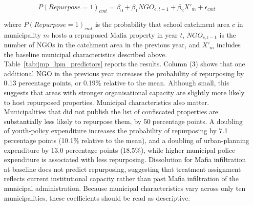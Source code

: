 \documentclass[12pt]{article}
\theoremstyle{plain}
\theoremstyle{plain}
\theoremstyle{plain}
\theoremstyle{definition}
\theoremstyle{plain}
\theoremstyle{definition}
\theoremstyle{plain}
\theoremstyle{remark}
\theoremstyle{definition}
\theoremstyle{definition}
\theoremstyle{plain}
\begin{document}
\begin{equation}
    P(Repurpose=1)_{cmt} = \beta_0 + \beta_1 NGO_{c,t-1} + \beta_2 X'_{m} + \epsilon_{cmt}
\end{equation}
\vspace{0.1cm}

where $P(Repurpose=1)_{cmt}$ is the probability that school catchment area $c$ in municipality $m$ hosts a repurposed Mafia property in year $t$, $NGO_{c,t-1}$ is the number of NGOs in the catchment area in the previous year, and $X'_{m}$ includes the baseline municipal characteristics described above. \\
Table~\ref{tab:jmp_lpm_predictors} reports the results. Column (3) shows that one additional NGO in the previous year increases the probability of repurposing by 0.13 percentage points, or 0.19\% relative to the mean. Although small, this suggests that areas with stronger organisational capacity are slightly more likely to host repurposed properties. Municipal characteristics also matter. Municipalities that did not publish the list of confiscated properties are substantially less likely to repurpose them, by 50 percentage points. A doubling of youth-policy expenditure increases the probability of repurposing by 7.1 percentage points (10.1\% relative to the mean), and a doubling of urban-planning expenditure by 13.0 percentage points (18.5\%), while higher municipal police expenditure is associated with less repurposing. Dissolution for Mafia infiltration at baseline does not predict repurposing, suggesting that treatment assignment reflects current institutional capacity rather than past Mafia infiltration of the municipal administration. Because municipal characteristics vary across only ten municipalities, these coefficients should be read as descriptive.\par
\end{document}
